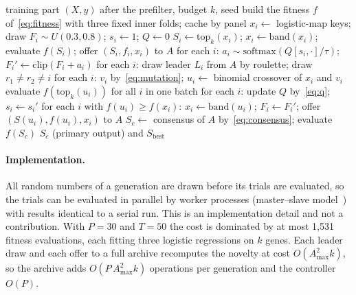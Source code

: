 \begin{algorithm}[t]
\caption{MPQDA-DE for one outer fold and one budget $k$}\label{alg:mpqda}
\begin{algorithmic}[1]
\Require training part $(X,y)$ after the prefilter, budget $k$, seed
\State build the fitness $f$ of~\eqref{eq:fitness} with three fixed inner folds; cache by panel
\State $x_i\gets$ logistic-map keys; draw $F_i\sim U(0.3,0.8)$; $s_i\gets1$; $Q\gets0$ 
\State $S_i\gets\mathrm{top}_k(x_i)$; $x_i\gets\mathrm{band}(x_i)$; evaluate $f(S_i)$; offer $(S_i,f_i,x_i)$ to $A$
  \State for each $i$: $a_i\sim\mathrm{softmax}(Q[s_i,\cdot]/\tau)$; $F_i'\gets\mathrm{clip}(F_i+a_i)$
  \State for each $i$: draw leader $L_i$ from $A$ by roulette; draw $r_1\neq r_2\neq i$
  \State for each $i$: $v_i$ by~\eqref{eq:mutation}; $u_i\gets$ binomial crossover of $x_i$ and $v_i$
  \State evaluate $f(\mathrm{top}_k(u_i))$ for all $i$ in one batch
  \State for each $i$: update $Q$ by~\eqref{eq:q}; $s_i\gets s_i'$
  \State for each $i$ with $f(u_i)\ge f(x_i)$: $x_i\gets\mathrm{band}(u_i)$; $F_i\gets F_i'$; offer $(S(u_i),f(u_i),x_i)$ to $A$
\EndFor
\State $S_c\gets$ consensus of $A$ by~\eqref{eq:consensus}; evaluate $f(S_c)$
\State \Return $S_c$ (primary output) and $S_{\mathrm{best}}$
\end{algorithmic}
\end{algorithm}

\paragraph{Implementation.} All random numbers of a generation are drawn before its trials are evaluated, so the trials can be
evaluated in parallel by worker processes (master--slave model~\cite{alba2002}) with results identical to a serial run. This is
an implementation detail and not a contribution. With $P=30$ and $T=50$ the cost is dominated by at most 1{,}531 fitness
evaluations, each fitting three logistic regressions on $k$ genes. Each leader draw and each offer to a full archive recomputes
the novelty at cost $O(A_{\max}^2k)$, so the archive adds $O(P\,A_{\max}^2k)$ operations per generation and the controller
$O(P)$.

